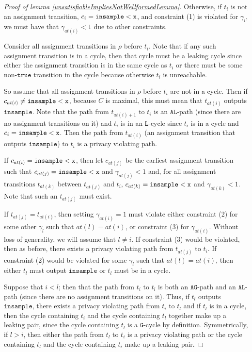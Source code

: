 \begin{proof}[Proof of lemma \ref{unsatisfiableImpliesNotWellformedLemma}]
    Otherwise, if $t_i$ is not an assignment transition, $c_i = \lguard[\texttt{x}]$, and constraint (1) is violated for $\gamma_i$, we must have that $\gamma_{at(i)}<1$ due to other constraints.
    
    Consider all assignment transitions in $\rho$ before $t_i$. Note that if any such assignment transition is in a cycle, then that cycle must be a leaking cycle since either the assignment transition is in the same cycle as $t_i$ or there must be some non-$\texttt{true}$ transition in the cycle because otherwise $t_i$ is unreachable.

    So assume that all assignment transitions in $\rho$ before $t_i$ are not in a cycle. Then if $c_{at(i)} \neq \lguard[\texttt{x}]$, because $C$ is maximal, this must mean that $t_{at(i)}$ outputs $\texttt{insample}$. Note that the path from $t_{at(i)+1}$ to $t_i$ is an $\texttt{AL}$-path (since there are no assignment transitions on it) and $t_i$ is in an $\texttt{L}$-cycle since $t_i$ is in a cycle and $c_i = \lguard[\texttt{x}]$. 
    Then the path from $t_{at(i)}$ (an assignment transition that outputs $\texttt{insample}$) to $t_i$ is a privacy violating path. 

    If $c_{at(i)} = \lguard[\texttt{x}]$, then let $c_{at(j)}$ be the earliest assignment transition such that $c_{at(j)} = \lguard[\texttt{x}]$ and $\gamma_{at(j)} < 1$ and, for all assignment transitions $t_{at(k)}$ between $t_{at(j)}$ and $t_i$, $c_{at(k)} = \lguard[\texttt{x}]$ and $\gamma_{at(k)} < 1$. Note that such an $t_{at(j)}$ must exist. 

    If $t_{at(j)} = t_{at(i)}$, then setting $\gamma_{at(i)} =1$ must violate either constraint (2) for some other $\gamma_l$ such that $at(l)=at(i)$, or constraint (3) for $\gamma_{at(i)}$. Without loss of generality, we will assume that $l\neq i$. If constraint (3) would be violated, then as before, there exists a privacy violating path from $t_{at(j)}$ to $t_i$. 
    If constraint (2) would be violated for some $\gamma_l$ such that $at(l)=at(i)$, then either $t_l$ must output $\texttt{insample}$ or $t_l$ must be in a cycle. 
    
    Suppose that $i<l$; then that the path from $t_i$ to $t_l$ is both an $\texttt{AG}$-path and an $\texttt{AL}$-path (since there are no assignment transitions on it). Thus, if $t_l$ outputs $\texttt{insample}$, there exists a privacy violating path from $t_i$ to $t_l$ and if $t_l$ is in a cycle, then the cycle containing $t_i$ and the cycle containing $t_l$ together make up a leaking pair, since the cycle containing $t_l$ is a $\texttt{G}$-cycle by definition. 
    Symmetrically, if $l>i$, then either the path from $t_l$ to $t_i$ is a privacy violating path or the cycle containing $t_l$ and the cycle containing $t_i$ make up a leaking pair.
    

\end{proof}

